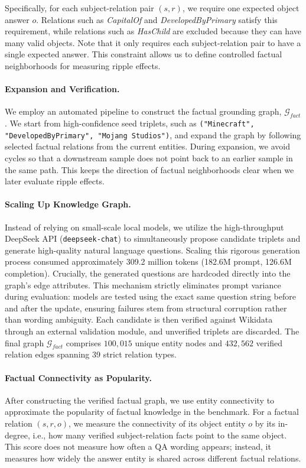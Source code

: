 Specifically, for each subject-relation pair $(s,r)$, we require one expected object answer $o$. Relations such as \textit{CapitalOf} and \textit{DevelopedByPrimary} satisfy this requirement, while relations such as \textit{HasChild} are excluded because they can have many valid objects. Note that it only requires each subject-relation pair to have a single expected answer. This constraint allows us to define controlled factual neighborhoods for measuring ripple effects.

\paragraph{Expansion and Verification.}
We employ an automated pipeline to construct the factual grounding graph, $\mathcal{G}_{fact}$. We start from high-confidence seed triplets, such as \texttt{("Minecraft", "DevelopedByPrimary", "Mojang Studios")}, and expand the graph by following selected factual relations from the current entities. During expansion, we avoid cycles so that a downstream sample does not point back to an earlier sample in the same path. This keeps the direction of factual neighborhoods clear when we later evaluate ripple effects. 

\paragraph{Scaling Up Knowledge Graph.}
Instead of relying on small-scale local models, we utilize the high-throughput DeepSeek API (\texttt{deepseek-chat}) to simultaneously propose candidate triplets and generate high-quality natural language questions. Scaling this rigorous generation process consumed approximately 309.2 million tokens (182.6M prompt, 126.6M completion). Crucially, the generated questions are hardcoded directly into the graph's edge attributes. This mechanism strictly eliminates prompt variance during evaluation: models are tested using the exact same question string before and after the update, ensuring failures stem from structural corruption rather than wording ambiguity. Each candidate is then verified against Wikidata \cite{vrandecic2014wikidata} through an external validation module, and unverified triplets are discarded. The final graph $\mathcal{G}_{fact}$ comprises $100,015$ unique entity nodes and $432,562$ verified relation edges spanning 39 strict relation types.

\paragraph{Factual Connectivity as Popularity.}
After constructing the verified factual graph, we use entity connectivity to approximate the popularity of factual knowledge in the benchmark. For a factual relation $(s,r,o)$, we measure the connectivity of its object entity $o$ by its in-degree, i.e., how many verified subject-relation facts point to the same object. This score does not measure how often a QA wording appears; instead, it measures how widely the answer entity is shared across different factual relations.

